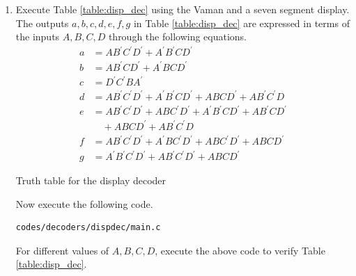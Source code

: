 \documentclass[journal,12pt,twocolumn]{IEEEtran}
\renewcommand\thesection{\arabic{section}}
\begin{document}
\begin{enumerate}[label=\thesection.\arabic*.,ref=\thesection.\theenumi]



\item Execute Table  \ref{table:disp_dec} using the Vaman and a seven segment display. 
\\
\solution The outputs $a,b,c,d,e,f,g$ in Table  \ref{table:disp_dec}  are expressed in terms of the inputs  $A,B,C,D$ through the following
equations. 
%
\begin{align}
\label{eq:disp_a}
a &= AB^{\prime}C^{\prime}D^{\prime}+A^{\prime}B^{\prime}CD^{\prime}
\\
\label{eq:disp_b}
b &= AB^{\prime}CD^{\prime}+A^{\prime}BCD^{\prime}
\\
\label{eq:disp_c}
c &= {D}^{\prime}{C}^{\prime}B{A}^{\prime}
\\
d &= AB^{\prime}C^{\prime}D^{\prime}+A^{\prime}B^{\prime}CD^{\prime}+ABCD^{\prime}+AB^{\prime}C^{\prime}D
\label{eq:disp_d}
\\
e &= AB^{\prime}C^{\prime}D^{\prime}+ABC^{\prime}D^{\prime}+A^{\prime}B^{\prime}CD^{\prime}+AB^{\prime}CD^{\prime}
\nonumber \\
&\quad +ABCD^{\prime}+AB^{\prime}C^{\prime}D
\label{eq:disp_e}
\\
f &= AB^{\prime}C^{\prime}D^{\prime}+A^{\prime}BC^{\prime}D^{\prime}+ABC^{\prime}D^{\prime}+ABCD^{\prime}
\label{eq:disp_f}
\\
g &= A^{\prime}B^{\prime}C^{\prime}D^{\prime}+AB^{\prime}C^{\prime}D^{\prime}+ABCD^{\prime}
\label{eq:disp_g}
\end{align}
\begin{table}
\centering

\caption{Truth table for the display decoder}
\label{table:disp_dec}
\end{table}
%
Now execute the following code.  
\begin{lstlisting}
codes/decoders/dispdec/main.c
\end{lstlisting}
For different values of $A,B,C,D$, execute the above code to verify Table \ref{table:disp_dec}.



\end{enumerate}
\end{document}
